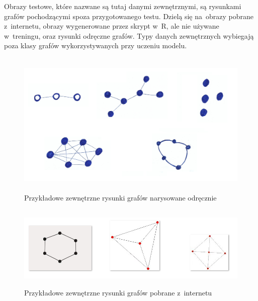Obrazy testowe, które nazwane są tutaj danymi zewnętrznymi, są rysunkami grafów pochodzącymi spoza przygotowanego testu.
Dzielą się na~obrazy pobrane z~internetu, obrazy wygenerowane przez skrypt w~R, ale nie używane w~treningu,
oraz rysunki odręczne grafów. Typy danych zewnętrznych wybiegają poza klasy grafów wykorzystywanych przy uczeniu modelu.

\begin{figure}[ht]
	\centering
	\includegraphics[height=7cm]{resources/model/images/ext-graphs-drawn.png}
	\caption{Przykładowe zewnętrzne rysunki grafów narysowane odręcznie}
	\label{Fig:tests-outside-1}
\end{figure}
\FloatBarrier

\begin{figure}[ht]
	\centering
	\includegraphics[height=4cm]{resources/model/images/ext-graphs-internet.png}
	\caption{Przykładowe zewnętrzne rysunki grafów pobrane z~internetu}
	\label{Fig:tests-outside-2}
\end{figure}
\FloatBarrier